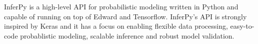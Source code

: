 InferPy is a high-level API for probabilistic modeling written in Python and capable of running on top of Edward and Tensorflow. InferPy's API is strongly inspired by Keras and it has a focus on enabling flexible data processing, easy-to-code probablistic modeling, scalable inference and robust model validation.
